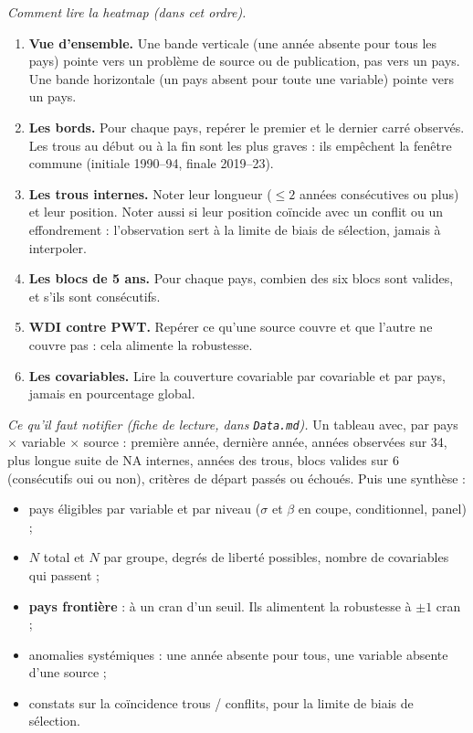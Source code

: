 \documentclass[21pt,a4paper]{article}
\newcommand{\sig}{\texorpdfstring{$\sigma$}{sigma}}
\newcommand{\bet}{\texorpdfstring{$\beta$}{beta}}
\begin{document}
	\textit{Comment lire la heatmap (dans cet ordre).}
	\begin{enumerate}
		\item \textbf{Vue d'ensemble.} Une bande verticale (une année absente pour tous les pays) pointe vers un problème de source ou de publication, pas vers un pays. Une bande horizontale (un pays absent pour toute une variable) pointe vers un pays.
		\item \textbf{Les bords.} Pour chaque pays, repérer le premier et le dernier carré observés. Les trous au début ou à la fin sont les plus graves : ils empêchent la fenêtre commune (initiale 1990--94, finale 2019--23).
		\item \textbf{Les trous internes.} Noter leur longueur ($\leq 2$ années consécutives ou plus) et leur position. Noter aussi si leur position coïncide avec un conflit ou un effondrement : l'observation sert à la limite de biais de sélection, jamais à interpoler.
		\item \textbf{Les blocs de 5 ans.} Pour chaque pays, combien des six blocs sont valides, et s'ils sont consécutifs.
		\item \textbf{WDI contre PWT.} Repérer ce qu'une source couvre et que l'autre ne couvre pas : cela alimente la robustesse.
		\item \textbf{Les covariables.} Lire la couverture covariable par covariable et par pays, jamais en pourcentage global.
	\end{enumerate}
	
	\textit{Ce qu'il faut notifier (fiche de lecture, dans \texttt{Data.md}).} Un tableau avec, par pays $\times$ variable $\times$ source : première année, dernière année, années observées sur 34, plus longue suite de NA internes, années des trous, blocs valides sur 6 (consécutifs oui ou non), critères de départ passés ou échoués. Puis une synthèse :
	\begin{itemize}
		\item pays éligibles par variable et par niveau (\sig{} et \bet{} en coupe, conditionnel, panel) ;
		\item $N$ total et $N$ par groupe, degrés de liberté possibles, nombre de covariables qui passent ;
		\item \textbf{pays frontière} : à un cran d'un seuil. Ils alimentent la robustesse à $\pm 1$ cran ;
		\item anomalies systémiques : une année absente pour tous, une variable absente d'une source ;
		\item constats sur la coïncidence trous / conflits, pour la limite de biais de sélection.
	\end{itemize}
	
\end{document}
